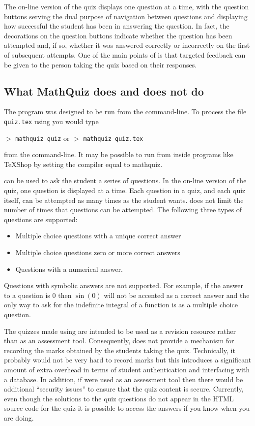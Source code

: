 \documentclass[svgnames]{article}
\begin{document}
    The on-line version of the quiz displays one question at a time,
    with the question buttons serving the dual purpose of navigation
    between questions and displaying how successful the student has been
    in answering the question. In fact, the decorations on the question
    buttons indicate whether the question has been attempted and, if so,
    whether it was answered correctly or incorrectly on the first of
    subsequent attempts. One of the main points of \MathQuiz is that
    targeted feedback can be given to the person taking the quiz based
    on their responses.

\subsection{What MathQuiz does and does not do}

    The \MathQuiz program was designed to be run from the command-line.
    To process the file \texttt{quiz.tex} using \MathQuiz you would
    type

    $>$ \Verb|mathquiz quiz| \qquad or \qquad $>$ \Verb|mathquiz quiz.tex|

    \noindent from the command-line. It may be possible to run \MathQuiz
    from inside programs like \TeX Shop by setting the compiler equal to
    \textsf{mathquiz}.

    \MathQuiz can be used to ask the student a series of questions. In
    the on-line version of the quiz, one question is displayed at a
    time. Each question in a quiz, and each quiz itself, can be
    attempted as many times as the student wants. \MathQuiz does not
    limit the number of times that questions can be attempted.
    The following three types of questions are supported:
    \begin{itemize}
      \item Multiple choice questions with a unique correct answer
      \item Multiple choice questions zero or more correct answers
      \item Questions with a numerical answer.
    \end{itemize}
    Questions with symbolic answers are not supported.
    For example, if the answer to a question is $0$ then $\sin(0)$ will
    not be accented as a correct answer and the only way to ask for the
    indefinite integral of a function is as a multiple choice question.

    The quizzes made using \MathQuiz are intended to be used as a
    revision resource rather than as an assessment tool. Consequently,
    \MathQuiz does not provide a mechanism for recording the marks
    obtained by the students taking the quiz. Technically, it probably
    would not be very hard to record marks but this introduces a
    significant amount of extra overhead in terms of student
    authentication and interfacing with a database. In addition, if
    \MathQuiz were used as an assessment tool then there would be
    additional ``security issues'' to ensure that the quiz content is
    secure. Currently, even though the solutions to the quiz questions
    do not appear in the HTML source code for the quiz it is possible to
    access the answers if you know when you are doing.
\end{document}
